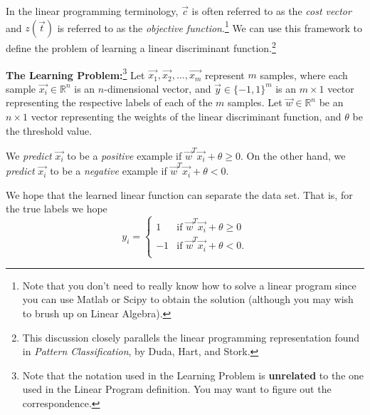 In the linear programming terminology, $\vec{c}$ is often referred
to as the {\em cost vector} and $z(\vec{t})$ is referred to as the {\em objective
function}.\footnote{Note that you don't need
to really know how to solve a linear program since you can use Matlab or Scipy to obtain the
solution (although you may wish to brush up on Linear Algebra). }
We can use this framework to define the problem of learning a linear
discriminant function.\footnote{This discussion closely
  parallels the linear programming representation found in 
  {\em Pattern Classification}, by Duda, Hart, and Stork.}

\textbf{The Learning Problem:}\footnote{Note that the notation used in the
Learning Problem is
{\bf unrelated} to the one used in the Linear Program definition. You may want to
figure out the correspondence.} \hspace{2mm}
Let $\vec{x_1}, \vec{x_2}, \ldots, \vec{x_m}$ 
represent $m$ samples, where each sample $\vec{x_i}\in \mathbb{R}^n$ is an $n$-dimensional
vector, and $\vec{y} \in \{-1, 1\}^m$ is an $m \times 1$
vector representing the respective labels of each of the $m$ samples. Let
$\vec{w} \in \mathbb{R}^n$ be an $n \times 1$ vector representing the weights of the
linear discriminant function, and $\theta$ be the threshold value. 

We {\em predict} $\vec{x_i}$ to be a {\em positive} example if
$\vec{w}^T \vec{x_i} + \theta \geq 0$. On the other hand, we {\em predict}
$\vec{x_i}$ to be a {\em negative} example if $\vec{w}^T \vec{x_i} + \theta < 0$.

We hope that the learned linear function can separate the data set.  
That is, for the true labels we hope
\begin{equation}
\label{eq:separable}
y_i = \begin{cases}
 1 & \mbox{if } \vec{w}^T \vec{x_i} + \theta \ge 0 \\
-1 & \mbox{if } \vec{w}^T \vec{x_i} + \theta < 0. \\
\end{cases}
\end{equation}

